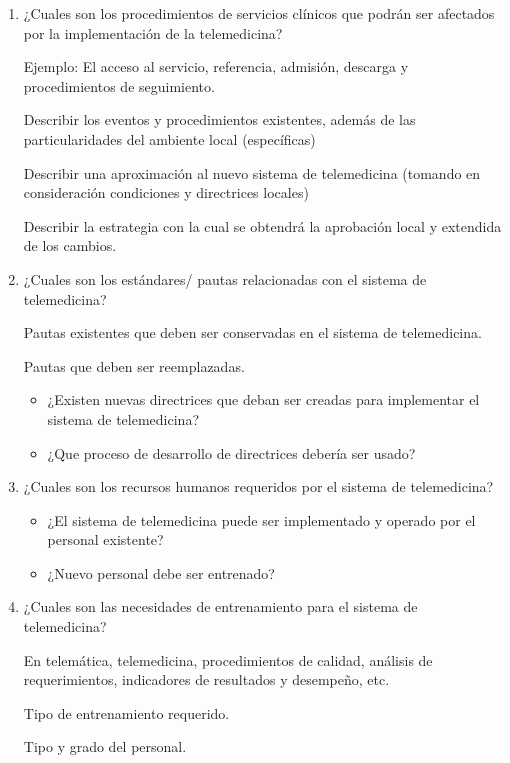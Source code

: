 \begin{enumerate}
\begin{itemize}
\end{itemize}

\item  ¿Cuales son los procedimientos de servicios clínicos que podrán ser afectados por la implementación de la telemedicina?
 
Ejemplo: El acceso al servicio,  referencia, admisión, descarga y procedimientos de seguimiento. 

Describir los eventos y procedimientos existentes, además de las particularidades del ambiente local (específicas) 

Describir una aproximación al nuevo sistema de telemedicina (tomando en consideración condiciones y directrices locales) 

Describir la estrategia  con la cual se obtendrá la aprobación local y extendida de los cambios. 

\item ¿Cuales son los estándares/ pautas relacionadas con el sistema de telemedicina?

Pautas existentes que deben ser conservadas en el sistema de telemedicina. 

Pautas que deben ser reemplazadas. 

\begin{itemize}
\item ¿Existen nuevas directrices que deban ser creadas para implementar el sistema de telemedicina? 

\item ¿Que proceso de desarrollo de directrices debería ser usado?

\end{itemize}

\item ¿Cuales son los recursos humanos requeridos por el sistema de telemedicina? 

\begin{itemize}
\item ¿El sistema de telemedicina puede ser implementado y operado por el personal existente? 

\item ¿Nuevo personal debe ser entrenado?
\end{itemize}

\item ¿Cuales son las necesidades de entrenamiento para el sistema de telemedicina?

En telemática, telemedicina, procedimientos de calidad, análisis de requerimientos, indicadores de resultados y desempeño, etc. 

Tipo de entrenamiento requerido.

Tipo y grado del personal.
\end{enumerate}

